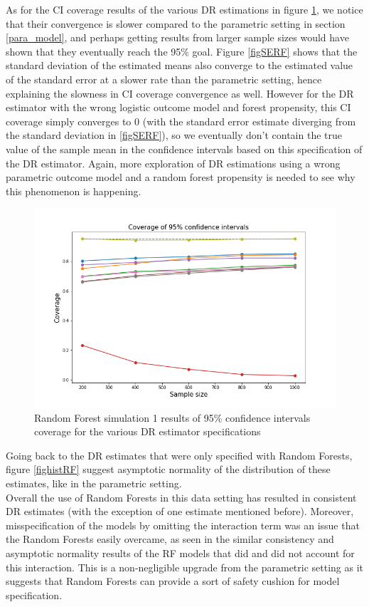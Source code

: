 \documentclass[12pt,twoside]{article}
\begin{document}
As for the CI coverage results of the various DR estimations in figure \ref{figCIRF}, we notice that their convergence is slower compared to the parametric setting in section \ref{para_model}, and perhaps getting results from larger sample sizes would have shown that they eventually reach the 95\% goal. Figure \ref{figSERF} shows that the standard deviation of the estimated means also converge to the estimated value of the standard error at a slower rate than the parametric setting, hence explaining the slowness in CI coverage convergence as well. However for the DR estimator with the wrong logistic outcome model and forest propensity, this CI coverage simply converges to 0 (with the standard error estimate diverging from the standard deviation in \ref{figSERF}), so we eventually don't contain the true value of the sample mean in the confidence intervals based on this specification of the DR estimator. Again, more exploration of DR estimations using a wrong parametric outcome model and a random forest propensity is needed to see why this phenomenon is happening.

\begin{figure}[h!]
    \centering
    \includegraphics[width = 0.9\columnwidth]{figures/CIRF.png}
    \caption{Random Forest simulation 1 results of 95\% confidence intervals coverage for the various DR estimator specifications}
    \label{figCIRF}
\end{figure}

Going back to the DR estimates that were only specified with Random Forests, figure \ref{fighistRF} suggest asymptotic normality of the distribution of these estimates, like in the parametric setting. \\

Overall the use of Random Forests in this data setting has resulted in consistent DR estimates (with the exception of one estimate mentioned before). Moreover, misspecification of the models by omitting the interaction term was an issue that the Random Forests easily overcame, as seen in the similar consistency and asymptotic normality results of the RF models that did and did not account for this interaction. This is a non-negligible upgrade from the parametric setting as it suggests that Random Forests can provide a sort of safety cushion for model specification.
\end{document}
